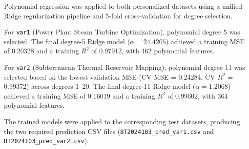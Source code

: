 \documentclass[10.5pt,a4paper]{article}
\begin{document}
Polynomial regression was applied to both personalized datasets using
a unified Ridge regularization pipeline and 5-fold cross-validation
for degree selection.

For \texttt{var1} (Power Plant Steam Turbine Optimization), polynomial
degree 5 was selected.  The final degree-5 Ridge model
($\alpha = 24.4205$) achieved a training MSE of 0.20328 and a training
$R^2$ of 0.97912, with 462 polynomial features.

For \texttt{var2} (Subterranean Thermal Reservoir Mapping), polynomial
degree 11 was selected based on the lowest validation MSE
(CV MSE = 0.24284, CV $R^2$ = 0.99372) across degrees 1--20.
The final degree-11 Ridge model ($\alpha = 1.2068$) achieved a training
MSE of 0.16019 and a training $R^2$ of 0.99602, with 364 polynomial
features.

The trained models were applied to the corresponding test datasets,
producing the two required prediction CSV files
(\texttt{BT2024103\_pred\_var1.csv} and
\texttt{BT2024103\_pred\_var2.csv}).
\end{document}
